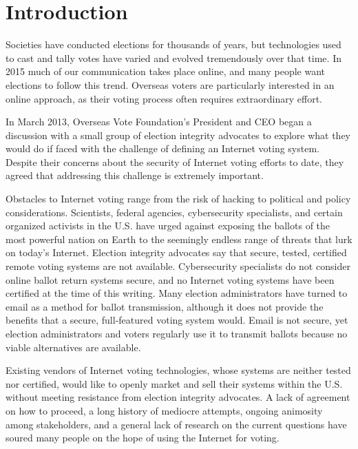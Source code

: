 \chapter{Introduction}
\label{chapter:introduction}

Societies have conducted elections for thousands of years, but
technologies used to cast and tally votes have varied and evolved
tremendously over that time. In 2015 much of our communication takes
place online, and many people want elections to follow this
trend. Overseas voters are particularly interested in an online
approach, as their voting process often requires extraordinary effort.

In March 2013, Overseas Vote Foundation’s President and CEO began a
discussion with a small group of election integrity advocates to
explore what they would do if faced with the challenge of defining an
Internet voting system. Despite their concerns about the security of
Internet voting efforts to date, they agreed that addressing this
challenge is extremely important. 

Obstacles to Internet voting range from the risk of hacking to
political and policy considerations. Scientists, federal agencies,
cybersecurity specialists, and certain organized activists in the
U.S. have urged against exposing the ballots of the most powerful
nation on Earth to the seemingly endless range of threats that lurk on
today’s Internet. Election integrity advocates say that secure,
tested, certified remote voting systems are not
available. Cybersecurity specialists do not consider online ballot
return systems secure, and no Internet voting systems have been
certified at the time of this writing. Many election administrators
have turned to email as a method for ballot transmission, although it
does not provide the benefits that a secure, full-featured voting
system would. Email is  not secure, yet election administrators and
voters regularly use it to transmit ballots because no viable
alternatives are available. 

Existing vendors of Internet voting technologies, whose systems are
neither tested nor certified, would like to openly market and sell
their systems within the U.S. without meeting resistance from election
integrity advocates. A lack of agreement on how to proceed, a long
history of mediocre attempts, ongoing animosity among stakeholders,
and a general lack of research on the current questions have soured
many people on the hope of using the Internet for voting.

